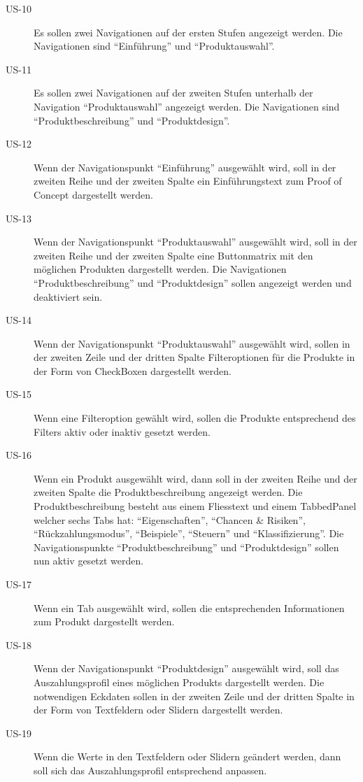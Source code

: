 \begin{description}
\item[US-10\label{itm:US-10}]
Es sollen zwei Navigationen auf der ersten Stufen angezeigt werden. Die
Navigationen sind ``Einführung'' und ``Produktauswahl''.

\item[US-11\label{itm:US-11}]
Es sollen zwei Navigationen auf der zweiten Stufen unterhalb der Navigation
``Produktauswahl'' angezeigt werden. Die Navigationen sind
``Produktbeschreibung'' und ``Produktdesign''.

\item[US-12\label{itm:US-12}]
Wenn der Navigationspunkt ``Einführung'' ausgewählt wird, soll in der zweiten
Reihe und der zweiten Spalte ein Einführungstext zum Proof of Concept
dargestellt werden.

\item[US-13\label{itm:US-13}]
Wenn der Navigationspunkt ``Produktauswahl'' ausgewählt wird, soll in der
zweiten Reihe und der zweiten Spalte eine Buttonmatrix mit den möglichen
Produkten dargestellt werden. Die Navigationen ``Produktbeschreibung'' und
``Produktdesign'' sollen angezeigt werden und deaktiviert sein.

\item[US-14\label{itm:US-14}]
Wenn der Navigationspunkt ``Produktauswahl'' ausgewählt wird, sollen in der
zweiten Zeile und der dritten Spalte Filteroptionen für die Produkte in der Form
von CheckBoxen dargestellt werden.

\item[US-15\label{itm:US-15}]
Wenn eine Filteroption gewählt wird, sollen die Produkte entsprechend des
Filters aktiv oder inaktiv gesetzt werden.

\item[US-16\label{itm:US-16}]
Wenn ein Produkt ausgewählt wird, dann soll in der zweiten Reihe und der zweiten
Spalte die Produktbeschreibung angezeigt werden. Die Produktbeschreibung
besteht aus einem Fliesstext und einem TabbedPanel welcher sechs Tabs hat:
``Eigenschaften'', ``Chancen \& Risiken'', ``Rückzahlungsmodus'',
``Beispiele'', ``Steuern'' und ``Klassifizierung''. Die Navigationspunkte
``Produktbeschreibung'' und ``Produktdesign'' sollen nun aktiv gesetzt werden.

\item[US-17\label{itm:US-17}]
Wenn ein Tab ausgewählt wird, sollen die entsprechenden Informationen zum
Produkt dargestellt werden.

\item[US-18\label{itm:US-18}]
Wenn der Navigationspunkt ``Produktdesign'' ausgewählt wird, soll das
Auszahlungsprofil eines möglichen Produkts dargestellt werden. Die notwendigen
Eckdaten sollen in der zweiten Zeile und der dritten Spalte in der Form von
Textfeldern oder Slidern dargestellt werden.

\item[US-19\label{itm:US-19}]
Wenn die Werte in den Textfeldern oder Slidern geändert werden, dann soll sich
das Auszahlungsprofil entsprechend anpassen.
\end{description}

